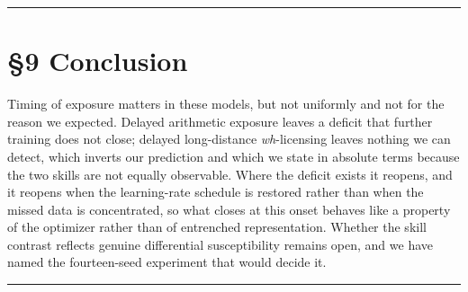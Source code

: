 \documentclass[11pt]{article}
\begin{document}
\begin{center}\rule{0.5\linewidth}{0.5pt}\end{center}

\section{§9 Conclusion}\label{conclusion}

Timing of exposure matters in these models, but not uniformly and not for the reason we
expected. Delayed arithmetic exposure leaves a deficit that further training does not close;
delayed long-distance \emph{wh}-licensing leaves nothing we can detect, which inverts our
prediction and which we state in absolute terms because the two skills are not equally
observable. Where the deficit exists it reopens, and it reopens when the learning-rate
schedule is restored rather than when the missed data is concentrated, so what closes at
this onset behaves like a property of the optimizer rather than of entrenched representation.
Whether the skill contrast reflects genuine differential susceptibility remains open, and we
have named the fourteen-seed experiment that would decide it.

\begin{center}\rule{0.5\linewidth}{0.5pt}\end{center}


\end{document}

